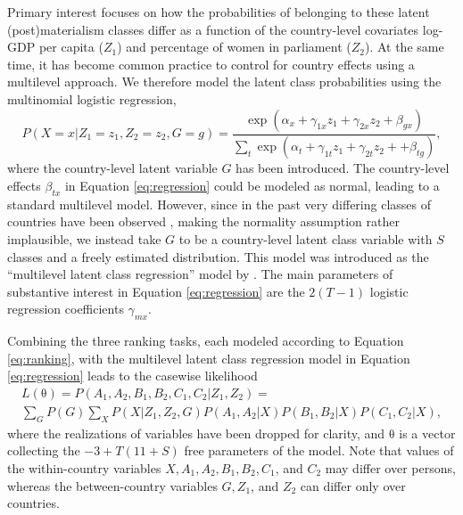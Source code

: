 \documentclass[letterpaper,12pt]{article}
\newcommand\vm[1]{%
\bm{\mathrm{#1}}}
\newcommand{\param}{\vm{\theta}}
\begin{document}
Primary interest focuses on how the probabilities of belonging to these latent (post)materialism classes differ as a function of the country-level covariates log-GDP per capita ($Z_1$) and percentage of women in parliament ($Z_2$).  At the same time, it has become common practice to control for country effects using a multilevel approach. We therefore model the latent class probabilities using the multinomial logistic regression,
\begin{equation}
P(X = x| Z_1 = z_1, Z_2 = z_2, G = g) = \frac{\exp(\alpha_x + \gamma_{1x} z_1 +\gamma_{2x} z_2  + \beta_{gx})}
					{\sum_t \exp(\alpha_t + \gamma_{1t} z_1 +  \gamma_{2t} z_2 +  + \beta_{tg})},
					\label{eq:regression}
\end{equation}
where the country-level latent variable $G$ has been introduced. The country-level effects $\beta_{tx}$ in Equation \ref{eq:regression} could be modeled as normal, leading to a standard multilevel model. However, since in the past very differing classes of countries have been observed \citep{moors2007heterogeneity}, making the normality assumption rather implausible, we instead take $G$ to be a country-level latent class variable with $S$ classes and a freely estimated distribution. This model was introduced as the ``multilevel latent class regression'' model by \citet{vermunt2003multilevel}.
The main parameters of substantive interest in Equation \ref{eq:regression} are the $2  (T - 1)$ logistic regression coefficients $\gamma_{mx}$.



Combining the three ranking tasks, each modeled according to Equation \ref{eq:ranking}, with the multilevel latent class regression model in Equation \ref{eq:regression} leads to the casewise likelihood
\begin{multline}
L(\param) = 
	P(A_1, A_2, 
		B_1, B_2, 
		C_1, C_2 | Z_1, Z_2) = \\
	\sum_{G} P(G)	\sum_{X} P(X | Z_1, Z_2, G)
				P(A_1, A_2 | X)
				P(B_1, B_2 | X) 
				P(C_1, C_2 | X),
				\label{eq:lik}
\end{multline}
where the realizations of variables have been dropped for clarity, and $\param$ is a vector collecting the $-3 + T (11 + S) $ free parameters of the model.
Note that values of the within-country variables $X, A_1, A_2, B_1, B_2, C_1$, and $C_2$ may differ over persons, whereas the between-country variables $G, Z_1$, and $Z_2$ can differ only over countries. 
\end{document}
